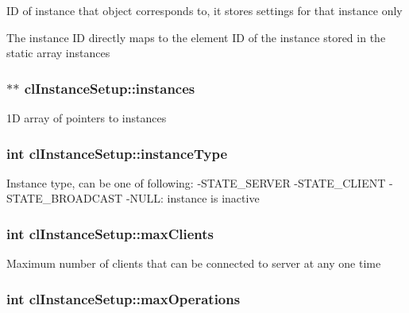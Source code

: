 \label{classcl_instance_setup_aca3c51adce99fa0900b023a4ab313a57}
ID of instance that object corresponds to, it stores settings for that instance only \par
 The instance ID directly maps to the element ID of the instance stored in the static array {\ttfamily instances} \hypertarget{classcl_instance_setup_a4c192965c87e9d50508c05589815139f}{
\subsubsection[{instances}]{$\ast$$\ast$ {\bf clInstanceSetup::instances}}}
\label{classcl_instance_setup_a4c192965c87e9d50508c05589815139f}
1D array of pointers to instances \hypertarget{classcl_instance_setup_a655807bb682504ab13a93e273263a445}{
\subsubsection[{instanceType}]{\setlength{\rightskip}{0pt plus 5cm}int {\bf clInstanceSetup::instanceType}}}
\label{classcl_instance_setup_a655807bb682504ab13a93e273263a445}
Instance type, can be one of following: -\/STATE\_\-SERVER -\/STATE\_\-CLIENT -\/STATE\_\-BROADCAST -\/NULL: instance is inactive \hypertarget{classcl_instance_setup_a3a536e872b3739d5eedcf68d8362733f}{
\subsubsection[{maxClients}]{\setlength{\rightskip}{0pt plus 5cm}int {\bf clInstanceSetup::maxClients}}}
\label{classcl_instance_setup_a3a536e872b3739d5eedcf68d8362733f}
Maximum number of clients that can be connected to server at any one time \hypertarget{classcl_instance_setup_aab4429f5f5e4dbb03e0ac7b57a367cbb}{
\subsubsection[{maxOperations}]{\setlength{\rightskip}{0pt plus 5cm}int {\bf clInstanceSetup::maxOperations}}}
